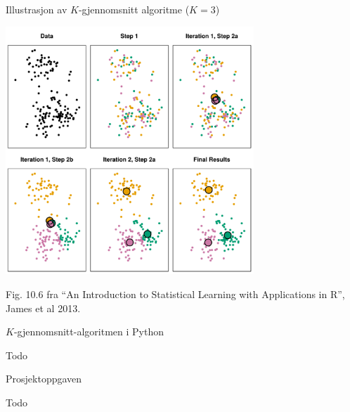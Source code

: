 \documentclass[10pt,ignorenonframetext,]{beamer}
\begin{document}
\begin{frame}

\begin{block}{Illustrasjon av \(K\)-gjennomsnitt algoritme (\(K=3\))}

\centering

\includegraphics[width=0.7\textwidth,height=\textheight]{10.6.pdf}

\scriptsize

Fig. 10.6 fra ``An Introduction to Statistical Learning with
Applications in R'', James et al 2013.

\end{block}

\end{frame}

\begin{frame}

\begin{block}{\(K\)-gjennomsnitt-algoritmen i Python}

Todo

\end{block}

\end{frame}

\begin{frame}

\begin{block}{Prosjektoppgaven}

Todo

\end{block}

\end{frame}
\end{document}
